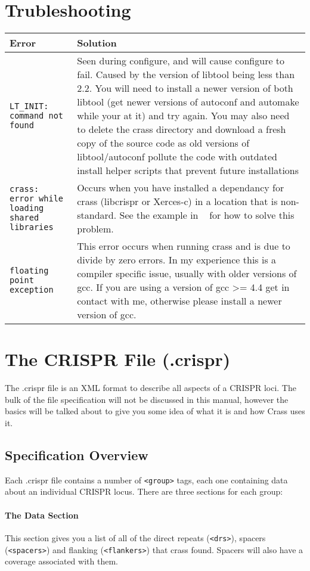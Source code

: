 \documentclass[11pt]{article} %
\begin{document}
\section{Trubleshooting}
\label{sec:trubleshooting}
\begin{longtabu} to \textwidth {X[1 , p ]  X[1 , p ]}
\hline
Error & Solution \\ \hline \hline 
\texttt{LT\_INIT: command not found} & Seen during configure, and will cause configure to fail.  Caused by the version of libtool being less than 2.2.  You will need to install a newer version of both libtool (get newer versions of autoconf and automake while your at it) and try again.  You may also need to delete the crass directory and download a fresh copy of the source code as old versions of libtool/autoconf pollute the code with outdated install helper scripts that prevent future installations \\
\texttt{crass: error while loading shared libraries} & Occurs when you have installed a dependancy for crass (libcrispr or Xerces-c) in a location that is non-standard.  See the example in ~ for how to solve this problem. \\
\texttt{floating point exception} & This error occurs when running crass and is due to divide by zero errors.  In my experience this is a compiler specific issue, usually with older versions of gcc.  If you are using a version of gcc \textgreater= 4.4 get in contact with me, otherwise please install a newer version of gcc.\\
\hline
\end{longtabu}

\section{The CRISPR File (.crispr)}
\label{sec:Fileformats}
The .crispr file is an XML format to describe all aspects of a CRISPR loci.  The bulk of the file specification will not be discussed in this manual, however the basics will be talked about to give you some idea of what it is and how Crass uses it.
\subsection{Specification Overview}
Each .crispr file contains a number of \lstinline[language=XML_new]$<group>$ tags, each one containing data about an individual CRISPR locus.  There are three sections for each group:
\paragraph{The Data Section}
This section gives you a list of all of the direct repeats (\lstinline[language=XML_new]$<drs>$), spacers (\lstinline[language=XML_new]$<spacers>$) and flanking (\lstinline[language=XML_new]$<flankers>$) that crass found.  Spacers will also have a coverage associated with them.
\end{document}

